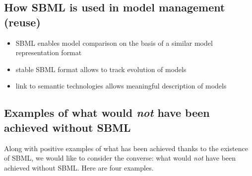 \subsection{How SBML is used in model management (reuse)}

\begin{itemize}
\item SBML enables model comparison on the basis of a similar model representation format
\item stable SBML format allows to track evolution of models 
\item link to semantic technologies allows meaningful description of models

\end{itemize}

\subsection{Examples of what would \emph{not} have been achieved without SBML}


Along with positive examples of what has been achieved thanks to the existence of SBML, we would like to consider the converse: what would \emph{not} have been achieved without SBML.  Here are four examples.


